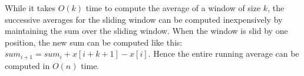 \begin{comment}
    return permuted
\end{verbatim} 

This produces an input stream where every element is at most $m$ positions away from its 
eventual sorted order. The original source material is a random list of numbers that has 
been put in ascending order. Each element is then moved to a randomly determined 
unoccupied position that is +/- $m$ slots away (taking care no gaps are left).

Then, to sort the items, each is inserted into a min-heap, and when the heap size is 
greater than m, one item is popped off (i.e., the min item is returned and removed from the 
heap and the heap is re-heapified) for every item that is pushed on.

\begin{verbatim}  
def AlmostSorted(n, m):
    # simulate a stream of random numbers by creating an almost-sorted 
    # array of n numbers, and iterating over them
    input = GetInputStream(n, m)
 
    # prepare an output array to store the output in; if we 
    # were really streaming, this would not exist
    output = range(0, n)
    for i in range(0, n):
        output[i] = None
    counter = 0
 
    # put each item into the heap, and if the size of the 
    # heap is over m, output the smallest item
    heap = []
    heapq.heapify(heap)
    heapsize = 0
    for i in range(n):
        heapq.heappush(heap, input[i])
        heapsize = heapsize + 1
        if heapsize > m:
            output[counter] = heapq.heappop(heap)
            counter = counter + 1
 
    # at the end of the stream, output the remaining items from the heap
    while counter < len(output):
            output[counter] = heapq.heappop(heap)
            counter = counter + 1
 
    return output
\end{verbatim}


This produces an output in sorted order, in constant time for each item regardless of the 
size of $n$. (Of course, for this Python implementation, the entire program must execute, 
making the operation time linear in $n$).

\end{comment}

While it takes $O(k)$ time to compute the average of a window of size
$k$, the successive averages for the sliding window can be computed
inexpensively
by maintaining the sum over the sliding window. When the window is
slid by one position, the new sum can be computed like this: 
$sum_{i+1} = sum_i + x[i+k+1] - x[i]$.  Hence the entire running
average can be computed in $O(n)$ time.


